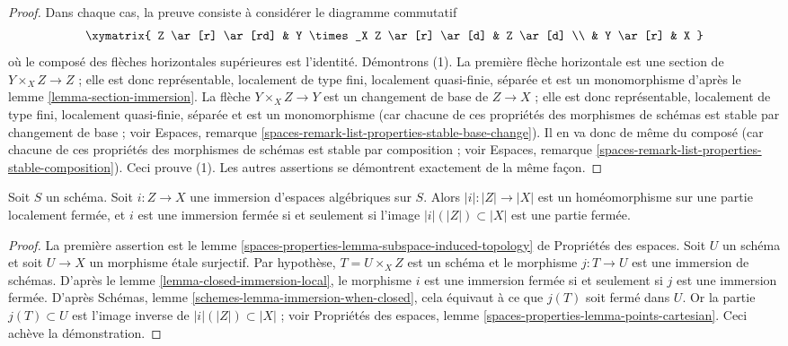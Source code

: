\begin{proof}
Dans chaque cas, la preuve consiste à considérer le diagramme commutatif
$$
\xymatrix{
Z \ar[r] \ar[rd] & Y \times_X Z \ar[r] \ar[d] & Z \ar[d] \\
& Y \ar[r] & X
}
$$
où le composé des flèches horizontales supérieures est l'identité.
Démontrons (1). La première flèche horizontale est une section de
$Y \times_X Z \to Z$ ; elle est donc représentable, localement de type fini,
localement quasi-finie, séparée et est un monomorphisme d'après le
lemme \ref{lemma-section-immersion}.
La flèche $Y \times_X Z \to Y$ est un changement de base de $Z \to X$ ;
elle est donc représentable, localement de type fini,
localement quasi-finie, séparée et est un monomorphisme
(car chacune de ces propriétés des morphismes de schémas est stable
par changement de base ; voir
Espaces, remarque \ref{spaces-remark-list-properties-stable-base-change}).
Il en va donc de même du composé (car chacune de ces propriétés des
morphismes de schémas est stable par composition ; voir Espaces, remarque
\ref{spaces-remark-list-properties-stable-composition}).
Ceci prouve (1). Les autres assertions se démontrent exactement de la même façon.
\end{proof}

\begin{lemma}
\label{lemma-immersion-when-closed}
Soit $S$ un schéma. Soit $i : Z \to X$ une immersion d'espaces
algébriques sur $S$. Alors $|i| : |Z| \to |X|$ est un homéomorphisme sur une
partie localement fermée, et $i$ est une immersion fermée si et seulement si
l'image $|i|(|Z|) \subset |X|$ est une partie fermée.
\end{lemma}

\begin{proof}
La première assertion est le lemme
\ref{spaces-properties-lemma-subspace-induced-topology} de Propriétés des espaces.
Soit $U$ un schéma et soit $U \to X$ un morphisme \'etale surjectif.
Par hypothèse, $T = U \times_X Z$ est un schéma et le morphisme $j : T \to U$
est une immersion de schémas. D'après le lemme \ref{lemma-closed-immersion-local},
le morphisme $i$ est une immersion fermée si et seulement si $j$ est une immersion
fermée. D'après Schémas, lemme \ref{schemes-lemma-immersion-when-closed},
cela équivaut à ce que $j(T)$ soit fermé dans $U$.
Or la partie $j(T) \subset U$ est l'image inverse de
$|i|(|Z|) \subset |X|$ ; voir
Propriétés des espaces, lemme \ref{spaces-properties-lemma-points-cartesian}.
Ceci achève la démonstration.
\end{proof}

